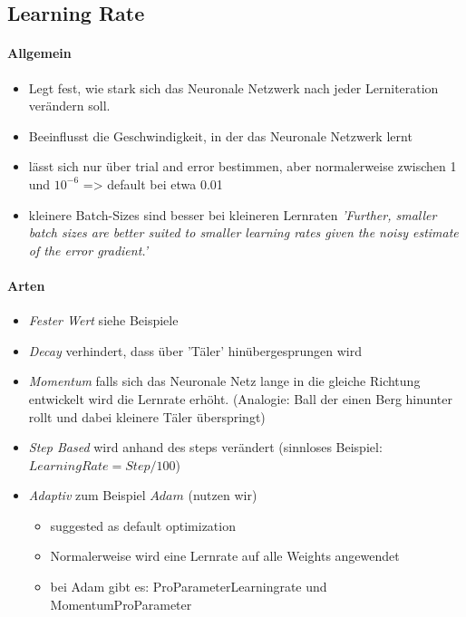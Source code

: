 \subsection{Learning Rate}
\paragraph{Allgemein \cite{learningrate-how-to-configure}}
\begin{itemize}
	\item Legt fest, wie stark sich das Neuronale Netzwerk nach jeder Lerniteration verändern soll.
	\item Beeinflusst die Geschwindigkeit, in der das Neuronale Netzwerk lernt
	\item lässt sich nur über trial and error bestimmen, aber normalerweise zwischen 1 und $10^{-6}$ => default bei etwa 0.01
	\item kleinere Batch-Sizes sind besser bei kleineren Lernraten
	\textit{'Further, smaller batch sizes are better suited to smaller learning rates given the noisy estimate of the error gradient.' \cite{learningrate-how-to-configure}}
\end{itemize}

\paragraph{Arten \cite{learningrate-understanding}}
\begin{itemize}
	\item \textit{Fester Wert} 
	siehe Beispiele
	
	\item \textit{Decay}
	verhindert, dass über 'Täler' hinübergesprungen wird
	
	\item \textit{Momentum}
	falls sich das Neuronale Netz lange in die gleiche Richtung entwickelt wird die Lernrate erhöht. (Analogie: Ball der einen Berg hinunter rollt und dabei kleinere Täler überspringt)
	
	\item \textit{Step Based}
	wird anhand des steps verändert (sinnloses Beispiel: $LearningRate = Step/100$)
	
	\item \textit{Adaptiv}
	zum Beispiel $Adam$ (nutzen wir) \cite{adam}
	
	\begin{itemize}
		\item suggested as default optimization
		\item Normalerweise wird eine Lernrate auf alle Weights angewendet
		\item bei Adam gibt es: ProParameterLearningrate und MomentumProParameter
	\end{itemize}
\end{itemize}


